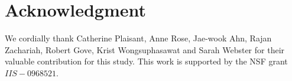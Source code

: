 \documentclass[conference,final]{IEEEtran}
\begin{document}
\section*{Acknowledgment}
We cordially thank Catherine Plaisant, Anne Rose, Jae-wook Ahn, Rajan Zachariah, Robert Gove, Krist Wongsuphasawat and Sarah Webster for their valuable contribution for this study. This work is supported by the NSF grant $IIS - 0968521$.



\end{document}
